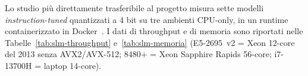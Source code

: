 Lo studio più direttamente trasferibile al progetto misura sette modelli \textit{instruction-tuned} quantizzati a 4 bit su tre ambienti CPU-only, in un runtime containerizzato in Docker~\cite{malakhov2026cpullm}. I dati di throughput e di memoria sono riportati nelle Tabelle~\ref{tab:slm-throughput} e~\ref{tab:slm-memoria} (E5-2695~v2 = Xeon 12-core del 2013 senza AVX2/AVX-512; 8480+ = Xeon Sapphire Rapids 56-core; i7-13700H = laptop 14-core).

\begin{table}[htbp]
	\centering
	\caption{Throughput (token/s), 4-bit GGUF su CPU~\cite{malakhov2026cpullm}.}
	\label{tab:slm-throughput}
	\small
\end{table}

